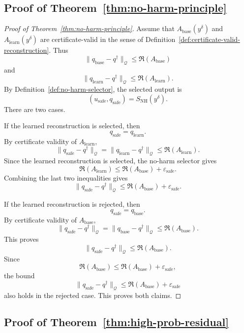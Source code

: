 \documentclass{article}
\numberwithin{equation}{section}
\theoremstyle{definition}
\begin{document}
\subsection{Proof of Theorem~\ref{thm:no-harm-principle}}

\begin{proof}[Proof of Theorem~\ref{thm:no-harm-principle}]
Assume that \(A_{\mathrm{base}}(y^\delta)\) and \(A_{\mathrm{learn}}(y^\delta)\) are certificate-valid in the sense of Definition~\ref{def:certificate-valid-reconstruction}. Thus
\[
\|q_{\mathrm{base}}-q^\dagger\|_{\mathcal Q}
\le
\mathfrak R(A_{\mathrm{base}})
\]
and
\[
\|q_{\mathrm{learn}}-q^\dagger\|_{\mathcal Q}
\le
\mathfrak R(A_{\mathrm{learn}}).
\]
By Definition~\ref{def:no-harm-selector}, the selected output is
\[
(u_{\mathrm{safe}},q_{\mathrm{safe}})
=
S_{\mathrm{NH}}(y^\delta).
\]
There are two cases.

If the learned reconstruction is selected, then
\[
q_{\mathrm{safe}}=q_{\mathrm{learn}}.
\]
By certificate validity of \(A_{\mathrm{learn}}\),
\[
\|q_{\mathrm{safe}}-q^\dagger\|_{\mathcal Q}
=
\|q_{\mathrm{learn}}-q^\dagger\|_{\mathcal Q}
\le
\mathfrak R(A_{\mathrm{learn}}).
\]
Since the learned reconstruction is selected, the no-harm selector gives
\[
\mathfrak R(A_{\mathrm{learn}})
\le
\mathfrak R(A_{\mathrm{base}})
+
\varepsilon_{\mathrm{safe}}.
\]
Combining the last two inequalities gives
\[
\|q_{\mathrm{safe}}-q^\dagger\|_{\mathcal Q}
\le
\mathfrak R(A_{\mathrm{base}})
+
\varepsilon_{\mathrm{safe}}.
\]

If the learned reconstruction is rejected, then
\[
q_{\mathrm{safe}}=q_{\mathrm{base}}.
\]
By certificate validity of \(A_{\mathrm{base}}\),
\[
\|q_{\mathrm{safe}}-q^\dagger\|_{\mathcal Q}
=
\|q_{\mathrm{base}}-q^\dagger\|_{\mathcal Q}
\le
\mathfrak R(A_{\mathrm{base}}).
\]
This proves
\[
\|q_{\mathrm{safe}}-q^\dagger\|_{\mathcal Q}
\le
\mathfrak R(A_{\mathrm{base}}).
\]
Since
\[
\mathfrak R(A_{\mathrm{base}})
\le
\mathfrak R(A_{\mathrm{base}})
+
\varepsilon_{\mathrm{safe}},
\]
the bound
\[
\|q_{\mathrm{safe}}-q^\dagger\|_{\mathcal Q}
\le
\mathfrak R(A_{\mathrm{base}})
+
\varepsilon_{\mathrm{safe}}
\]
also holds in the rejected case. This proves both claims.
\end{proof}

\subsection{Proof of Theorem~\ref{thm:high-prob-residual}}
\end{document}
